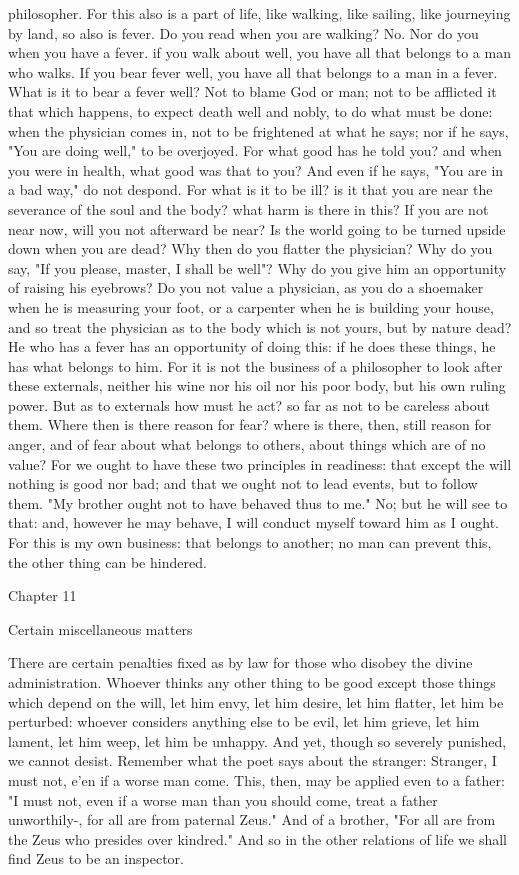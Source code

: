 \documentclass[a4paper]{article}
\begin{document}
philosopher. For this also is a part of life, like walking, like sailing, like
journeying by land, so also is fever. Do you read when you are walking? No. Nor
do you when you have a fever. if you walk about well, you have all that belongs
to a man who walks. If you bear fever well, you have all that belongs to a man
in a fever. What is it to bear a fever well? Not to blame God or man; not to be
afflicted it that which happens, to expect death well and nobly, to do what
must be done: when the physician comes in, not to be frightened at what he
says; nor if he says, "You are doing well," to be overjoyed. For what good has
he told you? and when you were in health, what good was that to you? And even
if he says, "You are in a bad way," do not despond. For what is it to be ill?
is it that you are near the severance of the soul and the body? what harm is
there in this? If you are not near now, will you not afterward be near? Is the
world going to be turned upside down when you are dead? Why then do you flatter
the physician? Why do you say, "If you please, master, I shall be well"? Why do
you give him an opportunity of raising his eyebrows? Do you not value a
physician, as you do a shoemaker when he is measuring your foot, or a carpenter
when he is building your house, and so treat the physician as to the body which
is not yours, but by nature dead? He who has a fever has an opportunity of
doing this: if he does these things, he has what belongs to him. For it is not
the business of a philosopher to look after these externals, neither his wine
nor his oil nor his poor body, but his own ruling power. But as to externals
how must he act? so far as not to be careless about them. Where then is there
reason for fear? where is there, then, still reason for anger, and of fear
about what belongs to others, about things which are of no value? For we ought
to have these two principles in readiness: that except the will nothing is good
nor bad; and that we ought not to lead events, but to follow them. "My brother
ought not to have behaved thus to me." No; but he will see to that: and,
however he may behave, I will conduct myself toward him as I ought. For this is
my own business: that belongs to another; no man can prevent this, the other
thing can be hindered.

Chapter 11

Certain miscellaneous matters

    There are certain penalties fixed as by law for those who disobey the
divine administration. Whoever thinks any other thing to be good except those
things which depend on the will, let him envy, let him desire, let him flatter,
let him be perturbed: whoever considers anything else to be evil, let him
grieve, let him lament, let him weep, let him be unhappy. And yet, though so
severely punished, we cannot desist.
    Remember what the poet says about the stranger:
       Stranger, I must not, e'en if a worse man come.
This, then, may be applied even to a father: "I must not, even if a worse man
than you should come, treat a father unworthily-, for all are from paternal
Zeus." And of a brother, "For all are from the Zeus who presides over kindred."
And so in the other relations of life we shall find Zeus to be an inspector.
\end{document}
